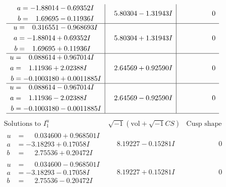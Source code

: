 \documentclass[1p]{elsarticle_modified}
\theoremstyle{definition}
\newcommand{\I}{\sqrt{-1}}
\begin{document}
$$\begin{array}{c|c|c}
\begin{aligned}
a &= -1.88014 - 0.69352 I \\
b &= \phantom{-}1.69695 - 0.11936 I\end{aligned}
 & \phantom{-}5.80304 - 1.31943 I & \phantom{-0.000000 } 0 \\ \hline\begin{aligned}
u &= \phantom{-}0.316551 - 0.968693 I \\
a &= -1.88014 + 0.69352 I \\
b &= \phantom{-}1.69695 + 0.11936 I\end{aligned}
 & \phantom{-}5.80304 + 1.31943 I & \phantom{-0.000000 } 0 \\ \hline\begin{aligned}
u &= \phantom{-}0.088614 + 0.967014 I \\
a &= \phantom{-}1.11936 + 2.02388 I \\
b &= -0.1003180 + 0.0011885 I\end{aligned}
 & \phantom{-}2.64569 + 0.92590 I & \phantom{-0.000000 } 0 \\ \hline\begin{aligned}
u &= \phantom{-}0.088614 - 0.967014 I \\
a &= \phantom{-}1.11936 - 2.02388 I \\
b &= -0.1003180 - 0.0011885 I\end{aligned}
 & \phantom{-}2.64569 - 0.92590 I & \phantom{-0.000000 } 0\\
 \hline 
 \end{array}$$\newpage$$\begin{array}{c|c|c}  
\text{Solutions to }I^u_{1}& \I (\text{vol} + \sqrt{-1}CS) & \text{Cusp shape}\\
 \hline 
\begin{aligned}
u &= \phantom{-}0.034600 + 0.968501 I \\
a &= -3.18293 + 0.17058 I \\
b &= \phantom{-}2.75536 + 0.20472 I\end{aligned}
 & \phantom{-}8.19227 - 0.15281 I & \phantom{-0.000000 } 0 \\ \hline\begin{aligned}
u &= \phantom{-}0.034600 - 0.968501 I \\
a &= -3.18293 - 0.17058 I \\
b &= \phantom{-}2.75536 - 0.20472 I\end{aligned}
 & \phantom{-}8.19227 + 0.15281 I & \phantom{-0.000000 } 0 \\ \hline\begin{aligned}

\end{aligned}
\end{array}$$
\end{document}
